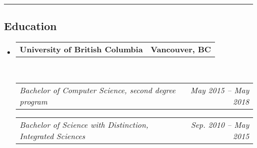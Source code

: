 \documentclass[10pt,letterpaper]{article}
\makeatletter
\newcommand{\headerrow}[2]
{\begin{tabular*}{\linewidth}{l@{\extracolsep{\fill}}r}
	#1 &
	#2 \\
\end{tabular*}}
\makeatother
\begin{document}
\hrule
\vspace{-0.4em}

\subsection*{Education}

\begin{itemize}
	\parskip=0.1em

	\item 
	\headerrow
		{\textbf{University of British Columbia}}
		{\textbf{Vancouver, BC}}
	\\
	\headerrow
		{\emph{Bachelor of Computer Science, second degree program}}
		{\emph{May 2015 -- May 2018}}
	\headerrow
		{\emph{Bachelor of Science with Distinction, Integrated Sciences}}
		{\emph{Sep. 2010 -- May 2015}}
\end{itemize}
\end{document}
